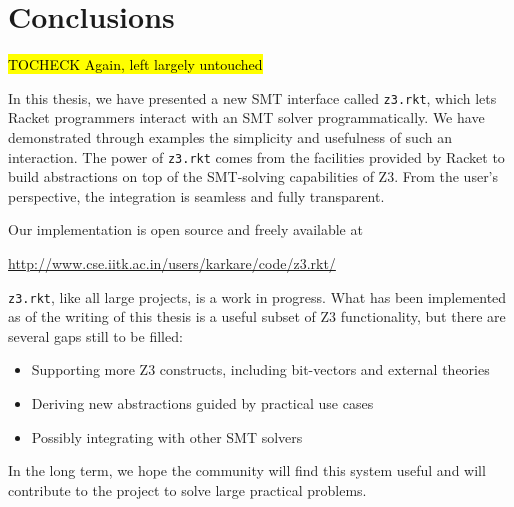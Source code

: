\chapter{Conclusions}

\hl{TOCHECK Again, left largely untouched}

In this thesis, we have presented a new SMT interface called \texttt{z3.rkt},
which lets Racket programmers interact with an SMT solver programmatically. We
have demonstrated through examples the simplicity and usefulness of such an
interaction. The power of \texttt{z3.rkt} comes from the facilities provided
by Racket to build abstractions on top of the SMT-solving capabilities of Z3.
From the user's perspective, the integration is seamless and fully
transparent.

Our implementation is open source and freely available at
\begin{center}
\url{http://www.cse.iitk.ac.in/users/karkare/code/z3.rkt/}
\end{center}

\texttt{z3.rkt}, like all large projects, is a work in progress. What has been
implemented as of the writing of this thesis is a useful subset of Z3
functionality, but there are several gaps still to be filled:

\begin{itemize}
\item Supporting more Z3 constructs, including bit-vectors and external theories
\item Deriving new abstractions guided by practical use cases
\item Possibly integrating with other SMT solvers
\end{itemize}

In the long term, we hope the community will find this system useful and will
contribute to the project to solve large practical problems.
